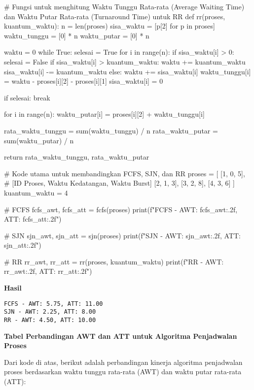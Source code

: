 \documentclass[12pt]{article}
\begin{document}
\begin{python}
# Fungsi untuk menghitung Waktu Tunggu Rata-rata (Average Waiting Time) dan Waktu Putar Rata-rata (Turnaround Time) untuk RR
def rr(proses, kuantum_waktu):
    n = len(proses)
    sisa_waktu = [p[2] for p in proses]
    waktu_tunggu = [0] * n
    waktu_putar = [0] * n

    waktu = 0
    while True:
        selesai = True
        for i in range(n):
            if sisa_waktu[i] > 0:
                selesai = False
                if sisa_waktu[i] > kuantum_waktu:
                    waktu += kuantum_waktu
                    sisa_waktu[i] -= kuantum_waktu
                else:
                    waktu += sisa_waktu[i]
                    waktu_tunggu[i] = waktu - proses[i][2] - proses[i][1]
                    sisa_waktu[i] = 0

        if selesai:
            break

    for i in range(n):
        waktu_putar[i] = proses[i][2] + waktu_tunggu[i]

    rata_waktu_tunggu = sum(waktu_tunggu) / n
    rata_waktu_putar = sum(waktu_putar) / n

    return rata_waktu_tunggu, rata_waktu_putar

# Kode utama untuk membandingkan FCFS, SJN, dan RR
proses = [
    [1, 0, 5],  # [ID Proses, Waktu Kedatangan, Waktu Burst]
    [2, 1, 3],
    [3, 2, 8],
    [4, 3, 6]
]
kuantum_waktu = 4

# FCFS
fcfs_awt, fcfs_att = fcfs(proses)
print(f"FCFS - AWT: {fcfs_awt:.2f}, ATT: {fcfs_att:.2f}")

# SJN
sjn_awt, sjn_att = sjn(proses)
print(f"SJN - AWT: {sjn_awt:.2f}, ATT: {sjn_att:.2f}")

# RR
rr_awt, rr_att = rr(proses, kuantum_waktu)
print(f"RR - AWT: {rr_awt:.2f}, ATT: {rr_att:.2f}")
\end{python}

\textbf{Hasil}

\vspace{0.5cm}
\begin{verbatim}
FCFS - AWT: 5.75, ATT: 11.00
SJN - AWT: 2.25, ATT: 8.00
RR - AWT: 4.50, ATT: 10.00
\end{verbatim}

\textbf{Tabel Perbandingan AWT dan ATT untuk Algoritma Penjadwalan Proses}

Dari kode di atas, berikut adalah perbandingan kinerja algoritma penjadwalan proses berdasarkan waktu tunggu rata-rata (AWT) dan waktu putar rata-rata (ATT):
\end{document}

